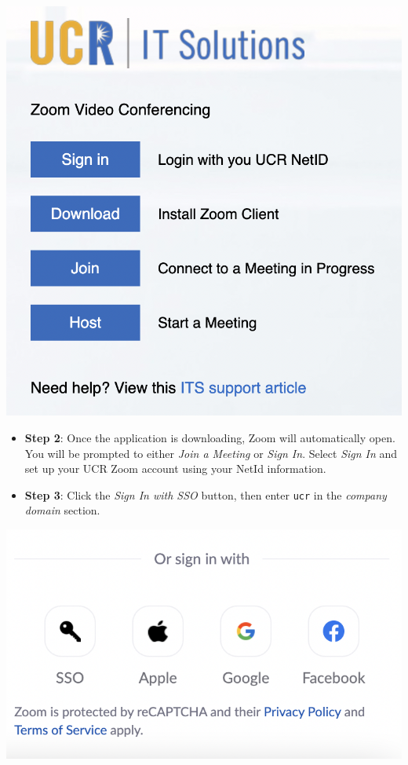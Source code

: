 \documentclass[
]{book}
\begin{document}
\begin{center}\includegraphics{images/zoomdownload} \end{center}

\begin{itemize}
\item
  \textbf{Step 2}: Once the application is downloading, Zoom will automatically open. You will be prompted to either \emph{Join a Meeting} or \emph{Sign In}. Select \emph{Sign In} and set up your UCR Zoom account using your NetId information.
\item
  \textbf{Step 3}: Click the \emph{Sign In with SSO} button, then enter \texttt{ucr} in the \emph{company domain} section.
\end{itemize}

\begin{center}\includegraphics{images/zoomsso} \end{center}
\end{document}
